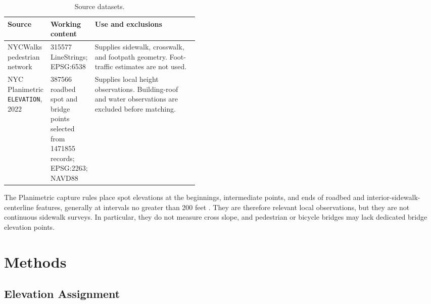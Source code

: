 \documentclass[twocolumn,10pt]{article}
\begin{document}
\begin{table}[t]
  \centering
  \caption{Source datasets.}
  \label{tab:sources}
  \small
  \begin{tabularx}{\linewidth}{@{}>{\raggedright\arraybackslash}p{0.22\linewidth}>{\raggedright\arraybackslash}p{0.22\linewidth}>{\raggedright\arraybackslash}X@{}}
    \toprule
    Source                                   & Working content                                                                                    & Use and exclusions                                                                                     \\
    \midrule
    NYCWalks pedestrian network              & \num{315577} LineStrings; EPSG:6538                                                                & Supplies sidewalk, crosswalk, and footpath geometry. Foot-traffic estimates are not used.              \\
    NYC Planimetric \texttt{ELEVATION}, 2022 & \num{387566} roadbed spot and bridge points selected from \num{1471855} records; EPSG:2263; NAVD88 & Supplies local height observations. Building-roof and water observations are excluded before matching. \\
    \bottomrule
  \end{tabularx}
\end{table}

The Planimetric capture rules place spot elevations at the beginnings, intermediate points, and ends of roadbed and interior-sidewalk-centerline features, generally at intervals no greater than 200 feet \citep{nyc2022capture}. They are therefore relevant local observations, but they are not continuous sidewalk surveys. In particular, they do not measure cross slope, and pedestrian or bicycle bridges may lack dedicated bridge elevation points.

\section{Methods}

\subsection{Elevation Assignment}
\end{document}
